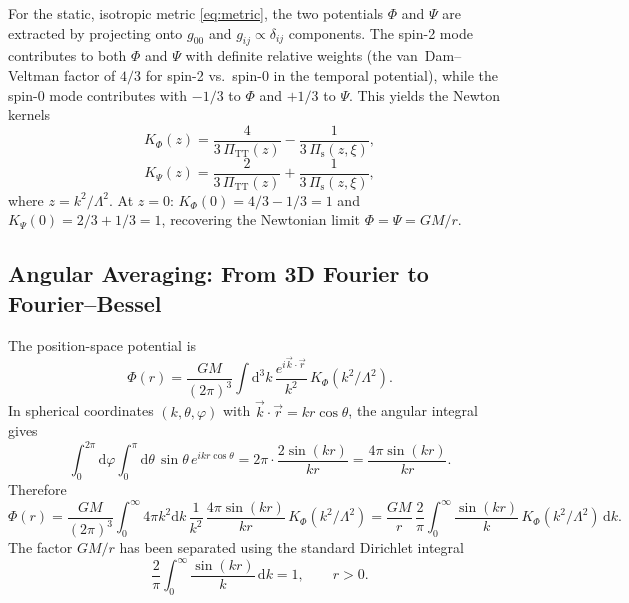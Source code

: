 \documentclass[11pt,a4paper]{article}
\newcommand{\dd}{\mathrm{d}}
\newcommand{\PiTT}{\Pi_{\mathrm{TT}}}
\newcommand{\Pis}{\Pi_{\mathrm{s}}}
\newcommand{\KPhi}{K_\Phi}
\newcommand{\KPsi}{K_\Psi}
\begin{document}
For the static, isotropic metric \eqref{eq:metric}, the two potentials
$\Phi$ and $\Psi$ are extracted by projecting onto $g_{00}$ and
$g_{ij} \propto \delta_{ij}$ components.  The spin-2 mode contributes to
both $\Phi$ and $\Psi$ with definite relative weights (the van~Dam--Veltman
factor of $4/3$ for spin-2 vs.\ spin-0 in the temporal potential), while
the spin-0 mode contributes with $-1/3$ to $\Phi$ and $+1/3$ to $\Psi$.
This yields the Newton kernels
\begin{equation}\label{eq:KPhi}
  \KPhi(z) = \frac{4}{3\,\PiTT(z)} - \frac{1}{3\,\Pis(z,\xi)},
\end{equation}
\begin{equation}\label{eq:KPsi}
  \KPsi(z) = \frac{2}{3\,\PiTT(z)} + \frac{1}{3\,\Pis(z,\xi)},
\end{equation}
where $z = k^2/\Lambda^2$.  At $z = 0$:
$\KPhi(0) = 4/3 - 1/3 = 1$ and $\KPsi(0) = 2/3 + 1/3 = 1$, recovering
the Newtonian limit $\Phi = \Psi = GM/r$.

\subsection{Angular Averaging: From 3D Fourier to Fourier--Bessel}
\label{sec:angular-averaging}

The position-space potential is
\begin{equation}
  \Phi(r) = \frac{GM}{(2\pi)^3}
  \int \dd^3k\, \frac{e^{i\vec{k}\cdot\vec{r}}}{k^2}\,\KPhi(k^2/\Lambda^2).
\end{equation}
In spherical coordinates $(k, \theta, \varphi)$ with $\vec{k}\cdot\vec{r}
= kr\cos\theta$, the angular integral gives
\begin{equation}
  \int_0^{2\pi}\!\dd\varphi \int_0^\pi\!\dd\theta\,\sin\theta\,
  e^{ikr\cos\theta}
  = 2\pi \cdot \frac{2\sin(kr)}{kr}
  = \frac{4\pi\sin(kr)}{kr}.
\end{equation}
Therefore
\begin{equation}
  \Phi(r) = \frac{GM}{(2\pi)^3}\int_0^\infty\!
  4\pi k^2\dd k\,\frac{1}{k^2}\,\frac{4\pi\sin(kr)}{kr}\,
  \KPhi(k^2/\Lambda^2)
  = \frac{GM}{r}\,\frac{2}{\pi}\int_0^\infty
  \frac{\sin(kr)}{k}\,\KPhi(k^2/\Lambda^2)\,\dd k.
\end{equation}
The factor $GM/r$ has been separated using the standard Dirichlet integral
\begin{equation}\label{eq:dirichlet}
  \frac{2}{\pi}\int_0^\infty \frac{\sin(kr)}{k}\,\dd k = 1,
  \qquad r > 0.
\end{equation}
\end{document}
